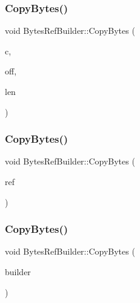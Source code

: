 \subsubsection{\texorpdfstring{Copy\+Bytes()}{CopyBytes()}\hspace{0.1cm}{\footnotesize\ttfamily [1/3]}}
{\footnotesize\ttfamily void Bytes\+Ref\+Builder\+::\+Copy\+Bytes (\begin{DoxyParamCaption}\item[{\mbox{\hyperlink{ZlibCrc32_8h_a2c212835823e3c54a8ab6d95c652660e}{const}} char $\ast$}]{c,  }\item[{\mbox{\hyperlink{ZlibCrc32_8h_a2c212835823e3c54a8ab6d95c652660e}{const}} uint32\+\_\+t}]{off,  }\item[{uint32\+\_\+t}]{len }\end{DoxyParamCaption})}

\mbox{\label{classlucene_1_1core_1_1util_1_1BytesRefBuilder_ad03ce9a53e3dbd380fc9b34dcfa3de51}} 
\subsubsection{\texorpdfstring{Copy\+Bytes()}{CopyBytes()}\hspace{0.1cm}{\footnotesize\ttfamily [2/3]}}
{\footnotesize\ttfamily void Bytes\+Ref\+Builder\+::\+Copy\+Bytes (\begin{DoxyParamCaption}\item[{\mbox{\hyperlink{classlucene_1_1core_1_1util_1_1BytesRef}{Bytes\+Ref}} \&}]{ref }\end{DoxyParamCaption})}

\mbox{\label{classlucene_1_1core_1_1util_1_1BytesRefBuilder_a3fccb29fdf28aad9a850b17228f2b71a}} 
\subsubsection{\texorpdfstring{Copy\+Bytes()}{CopyBytes()}\hspace{0.1cm}{\footnotesize\ttfamily [3/3]}}
{\footnotesize\ttfamily void Bytes\+Ref\+Builder\+::\+Copy\+Bytes (\begin{DoxyParamCaption}\item[{\mbox{\hyperlink{classlucene_1_1core_1_1util_1_1BytesRefBuilder}{Bytes\+Ref\+Builder}} \&}]{builder }\end{DoxyParamCaption})}


